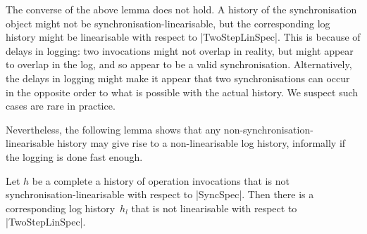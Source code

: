 
The converse of the above lemma does not hold.  A history of the
synchronisation object might not be synchronisation-linearisable, but the
corresponding log history might be linearisable with respect to
|TwoStepLinSpec|.  This is because of delays in logging: two invocations might
not overlap in reality, but might appear to overlap in the log, and so appear
to be a valid synchronisation.  Alternatively, the delays in logging might
make it appear that two synchronisations can occur in the opposite order to
what is possible with the actual history.  We suspect such cases are rare in
practice.

Nevertheless, the following lemma shows that any non-synchronisation-linearisable
history may give rise to a non-linearisable log history, informally if the
logging is done fast enough. 
\begin{lemma}
\label{lem:hacking-can-succeed}
Let $h$ be a complete a history of operation invocations that is not
synchronisation-linearisable with respect to |SyncSpec|.  Then there is a
corresponding log history~$h_l$ that is not linearisable with respect to
|TwoStepLinSpec|.
\end{lemma}
%
